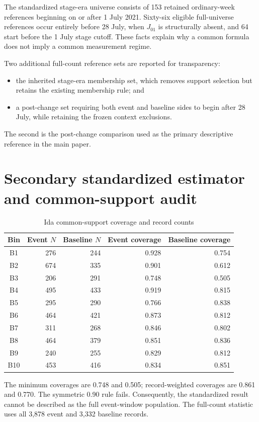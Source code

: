 \documentclass[11pt]{article}
\begin{document}
The standardized stage-era universe consists of 153 retained ordinary-week references beginning on or after 1 July 2021. Sixty-six eligible full-universe references occur entirely before 28 July, when $J_{01}$ is structurally absent, and 64 start before the 1 July stage cutoff. These facts explain why a common formula does not imply a common measurement regime.

Two additional full-count reference sets are reported for transparency:
\begin{itemize}
\item the inherited stage-era membership set, which removes support selection but retains the existing membership rule; and
\item a post-change set requiring both event and baseline sides to begin after 28 July, while retaining the frozen context exclusions.
\end{itemize}
The second is the post-change comparison used as the primary descriptive reference in the main paper.

\section{Secondary standardized estimator and common-support audit}

\begin{table}[t]
\centering
\caption{Ida common-support coverage and record counts}
\label{tab:coverage}
\begin{tabular}{@{}crrrr@{}}
\toprule
Bin & Event $N$ & Baseline $N$ & Event coverage & Baseline coverage \\
\midrule
B1 & 276 & 244 & 0.928 & 0.754 \\
B2 & 674 & 335 & 0.901 & 0.612 \\
B3 & 206 & 291 & 0.748 & 0.505 \\
B4 & 495 & 433 & 0.919 & 0.815 \\
B5 & 295 & 290 & 0.766 & 0.838 \\
B6 & 464 & 421 & 0.873 & 0.812 \\
B7 & 311 & 268 & 0.846 & 0.802 \\
B8 & 464 & 379 & 0.851 & 0.836 \\
B9 & 240 & 255 & 0.829 & 0.812 \\
B10 & 453 & 416 & 0.834 & 0.851 \\
\bottomrule
\end{tabular}
\end{table}

The minimum coverages are 0.748 and 0.505; record-weighted coverages are 0.861 and 0.770. The symmetric 0.90 rule fails. Consequently, the standardized result cannot be described as the full event-window population. The full-count statistic uses all 3,878 event and 3,332 baseline records.
\end{document}
